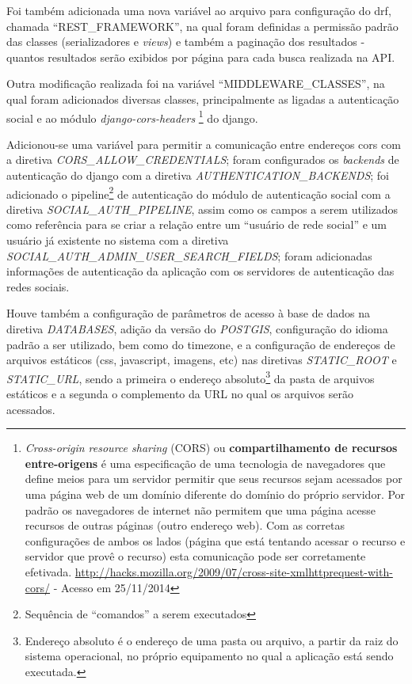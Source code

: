 Foi também adicionada uma nova variável ao arquivo para configuração do \gls{drf}, chamada ``REST\_FRAMEWORK'', na qual foram definidas a permissão padrão das classes (serializadores e \textit{views}) e também a paginação dos resultados - quantos resultados serão exibidos por página para cada busca realizada na API.

Outra modificação realizada foi na variável ``MIDDLEWARE\_CLASSES'', na qual foram adicionados diversas classes, principalmente as ligadas a autenticação social e ao módulo \textit{django-cors-headers}%
\footnote{\textit{Cross-origin resource sharing} (CORS) ou \textbf{compartilhamento de recursos entre-origens} é uma especificação de uma tecnologia de navegadores que define meios para um servidor permitir que seus recursos sejam acessados por uma página web de um domínio diferente do domínio do próprio servidor. Por padrão os navegadores de internet não permitem que uma página acesse recursos de outras páginas (outro endereço web). Com as corretas configurações de ambos os lados (página que está tentando acessar o recurso e servidor que provê o recurso) esta comunicação pode ser corretamente efetivada. \url{http://hacks.mozilla.org/2009/07/cross-site-xmlhttprequest-with-cors/} - Acesso em 25/11/2014} do \gls{django}.

Adicionou-se uma variável para permitir a comunicação entre endereços \gls{cors} com a diretiva \textit{CORS\_ALLOW\_CREDENTIALS}; foram configurados os \textit{backends} de autenticação do django com a diretiva \textit{AUTHENTICATION\_BACKENDS}; foi adicionado o pipeline\footnote{Sequência de ``comandos'' a serem executados} de autenticação do módulo de autenticação social com a diretiva \textit{SOCIAL\_AUTH\_PIPELINE}, assim como os campos a serem utilizados como referência para se criar a relação entre um ``usuário de rede social'' e um usuário já existente no sistema com a diretiva \textit{SOCIAL\_AUTH\_ADMIN\_USER\_SEARCH\_FIELDS}; foram adicionadas informações de autenticação da aplicação com os servidores de autenticação das redes sociais.

Houve também a configuração de parâmetros de acesso à base de dados na diretiva \textit{DATABASES}, adição da versão do \textit{POSTGIS}, configuração do idioma padrão a ser utilizado, bem como do timezone, e a configuração de endereços de arquivos estáticos (css, javascript, imagens, etc) nas diretivas \textit{STATIC\_ROOT} e \textit{STATIC\_URL}, sendo a primeira o endereço absoluto\footnote{Endereço absoluto é o endereço de uma pasta ou arquivo, a partir da raiz do sistema operacional, no próprio equipamento no qual a aplicação está sendo executada.} da pasta de arquivos estáticos e a segunda o complemento da URL no qual os arquivos serão acessados.

